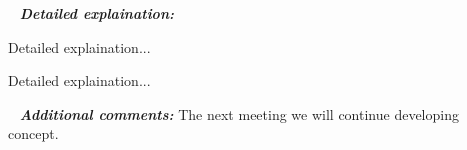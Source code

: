    \newline
  \textit{\textbf{Detailed explaination:}}
  \begin{enumerate*}
  	\item Detailed explaination...
  	\begin{figure}[H]
  		\begin{minipage}[h]{1\linewidth}
  			\caption{}
  		\end{minipage}
  	\end{figure}
  	
  	\item Detailed explaination...
  	\begin{figure}[H]
  		\begin{minipage}[h]{1\linewidth}
  			\caption{}
  		\end{minipage}
  	\end{figure}
  	
  \end{enumerate*}
  
   \newline
  \textit{\textbf{Additional comments:}} The next meeting we will continue developing concept.

\fillpage
